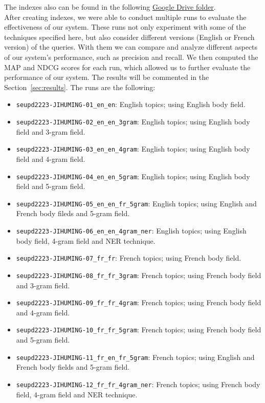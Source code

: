 The indexes also can be found in the following
\href{https://drive.google.com/drive/folders/1CK_kLeZ5Us3VJe8hiG1vhwPrDs94cLvU?usp=share_link}{Google Drive folder}.\\

After creating indexes, we were able to conduct multiple runs to evaluate the effectiveness of our system.
These runs not only experiment with some of the techniques specified here, but also consider different versions (English
or French version) of the queries.
With them we can compare and analyze different aspects of our system's performance, such as precision and recall.
We then computed the MAP and NDCG scores for each run, which allowed us to further evaluate the performance of our 
system.
The results will be commented in the Section~\ref{sec:results}.
The runs are the following:
\begin{itemize}
	\item \texttt{seupd2223-JIHUMING-01\_en\_en}: English topics; using English body field.
	\item \texttt{seupd2223-JIHUMING-02\_en\_en\_3gram}: English topics; using English body field and 3-gram field.
	\item \texttt{seupd2223-JIHUMING-03\_en\_en\_4gram}: English topics; using English body field and 4-gram field.
	\item \texttt{seupd2223-JIHUMING-04\_en\_en\_5gram}: English topics; using English body field and 5-gram field.
	\item \texttt{seupd2223-JIHUMING-05\_en\_en\_fr\_5gram}: English topics; using English and French body fileds and 5-gram field.
	\item \texttt{seupd2223-JIHUMING-06\_en\_en\_4gram\_ner}: English topics; using English body field, 4-gram field and NER technique.
	\item \texttt{seupd2223-JIHUMING-07\_fr\_fr}: French topics; using French body field.
	\item \texttt{seupd2223-JIHUMING-08\_fr\_fr\_3gram}: French topics; using French body field and 3-gram field.
	\item \texttt{seupd2223-JIHUMING-09\_fr\_fr\_4gram}: French topics; using French body field and 4-gram field.
	\item \texttt{seupd2223-JIHUMING-10\_fr\_fr\_5gram}: French topics; using French body field and 5-gram field.
	\item \texttt{seupd2223-JIHUMING-11\_fr\_en\_fr\_5gram}: French topics; using English and French body fields and 5-gram field.
	\item \texttt{seupd2223-JIHUMING-12\_fr\_fr\_4gram\_ner}: French topics; using French body field, 4-gram field and NER technique.
\end{itemize}